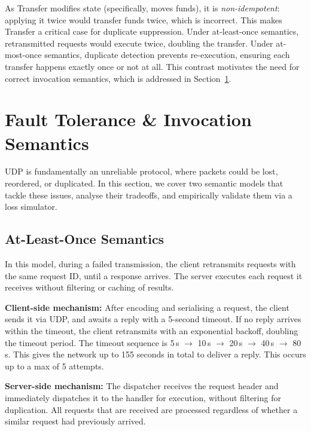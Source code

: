 \documentclass[9pt,a4paper]{article}
\begin{document}
As Transfer modifies state (specifically, moves funds), it is \textit{non-idempotent}: applying it twice would transfer funds twice, which is incorrect. This makes Transfer a critical case for duplicate suppression. Under at-least-once semantics, retransmitted requests would execute twice, doubling the transfer. Under at-most-once semantics, duplicate detection prevents re-execution, ensuring each transfer happens exactly once or not at all. This contrast motivates the need for correct invocation semantics, which is addressed in Section~\ref{sec:fault-tolerance}.


\section{Fault Tolerance \& Invocation Semantics}
\label{sec:fault-tolerance}

UDP is fundamentally an unreliable protocol, where packets could be lost, reordered, or duplicated. In this section, we cover two semantic models that tackle these issues, analyse their tradeoffs, and empirically validate them via a loss simulator.

\subsection{At-Least-Once Semantics}

In this model, during a failed transmission, the client retransmits requests with the same request ID, until a response arrives. The server executes each request it receives without filtering or caching of results.

\textbf{Client-side mechanism:} After encoding and serialising a request, the client sends it via UDP, and awaits a reply with a 5-second timeout. If no reply arrives within the timeout, the client retransmits with an exponential backoff, doubling the timeout period.
The timeout sequence is 5\,s $\rightarrow$ 10\,s $\rightarrow$ 20\,s $\rightarrow$ 40\,s $\rightarrow$ 80\,s.
This gives the network up to 155 seconds in total to deliver a reply.
This occurs up to a max of 5 attempts.


\textbf{Server-side mechanism:} The dispatcher receives the request header and immediately dispatches it to the handler for execution, without filtering for duplication. All requests that are received are processed regardless of whether a similar request had previously arrived.
\end{document}
